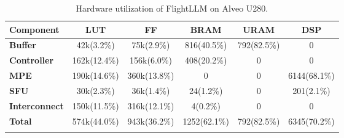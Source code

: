 \begin{table}[t]
\footnotesize
\setlength\tabcolsep{3pt}
\caption{Hardware utilization of FlightLLM on Alveo U280.}
\vspace{-10pt}
\begin{tabular}{lccccc}
\toprule
\textbf{Component}                                                   & \textbf{LUT}  & \textbf{FF}  & \textbf{BRAM} & \textbf{URAM} & \textbf{DSP}  \\ 
\midrule
\textbf{Buffer}                                                      & 42k(3.2\%)    & 75k(2.9\%)   & 816(40.5\%)   & 792(82.5\%)   & 0             \\ \midrule
\textbf{Controller} & 162k(12.4\%)  & 156k(6.0\%)  & 408(20.2\%)   & 0             & 0             \\ \midrule
\textbf{MPE}                                                     & 190k(14.6\%) & 360k(13.8\%) & 0             & 0             & 6144(68.1\%)  \\ \midrule
\textbf{SFU}                                                   & 30k(2.3\%)    & 36k(1.4\%)   & 24(1.2\%)     & 0             & 201(2.1\%)    \\ \midrule
\textbf{Interconnect}                                                & 150k(11.5\%)  & 316k(12.1\%) & 4(0.2\%)      & 0             & 0             \\ \midrule
\textbf{Total}                                                       & 574k(44.0\%)  & 943k(36.2\%) & 1252(62.1\%)  & 792(82.5\%)   & 6345(70.2\%) \\
\bottomrule
\vspace{-15pt}
\end{tabular}
\label{tab:exp_utilization}
\end{table}